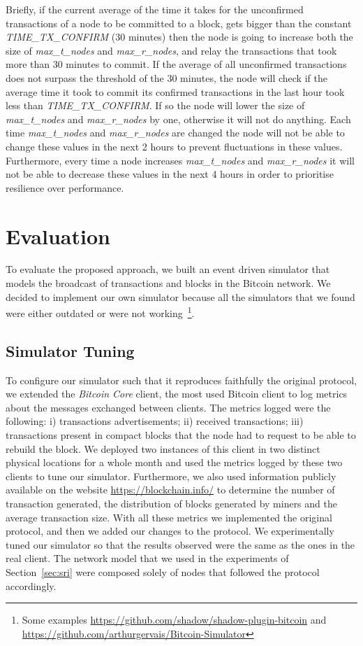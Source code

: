 \documentclass{dads}   %
\begin{document}
Briefly, if the current average of the time it takes for the unconfirmed transactions of a node to be committed to a block, gets bigger than the constant \textsl{TIME\_TX\_CONFIRM} (30 minutes) then the node is going to increase both the size of \textsl{max\_t\_nodes} and \textsl{max\_r\_nodes}, and relay the transactions that took more than 30 minutes to commit. 
If the average of all unconfirmed transactions does not surpass the threshold of the 30 minutes, the node will check if the average time it took to commit its confirmed transactions in the last hour took less than \textsl{TIME\_TX\_CONFIRM}. If so the node will lower the size of \textsl{max\_t\_nodes} and \textsl{max\_r\_nodes} by one, otherwise it will not do anything. Each time \textsl{max\_t\_nodes} and \textsl{max\_r\_nodes} are changed the node will not be able to change these values in the next 2 hours to prevent fluctuations in these values. Furthermore, every time a node increases \textsl{max\_t\_nodes} and \textsl{max\_r\_nodes} it will not be able to decrease these values in the next 4 hours in order to prioritise resilience over performance.

\section{Evaluation}
\label{sec:evaluation}
To evaluate the proposed approach, we built an event driven simulator that models the broadcast of transactions and blocks in the Bitcoin network. We decided to implement our own simulator because all the simulators that we found were either outdated or were not working~\footnote{Some examples \url{https://github.com/shadow/shadow-plugin-bitcoin} and \url{https://github.com/arthurgervais/Bitcoin-Simulator}}. 

\subsection{Simulator Tuning}
To configure our simulator such that it reproduces faithfully the original protocol, we extended the \textsl{Bitcoin Core} client, the most used Bitcoin client to log metrics about the messages exchanged between clients. The metrics logged were the following: i) transactions advertisements; ii) received transactions; iii) transactions present in compact blocks that the node had to request to be able to rebuild the block. We deployed two instances of this client in two distinct physical locations for a whole month and used the metrics logged by these two clients to tune our simulator. Furthermore, we also used information publicly available on the website \url{https://blockchain.info/} to determine the number of transaction generated, the distribution of blocks generated by miners and the average transaction size. With all these metrics we implemented the original protocol, and then we added our changes to the protocol. We experimentally tuned our simulator so that the results observed were the same as the ones in the real client. The network model that we used in the experiments of Section~\ref{sec:sri} were composed solely of nodes that followed the protocol accordingly.
\end{document}
